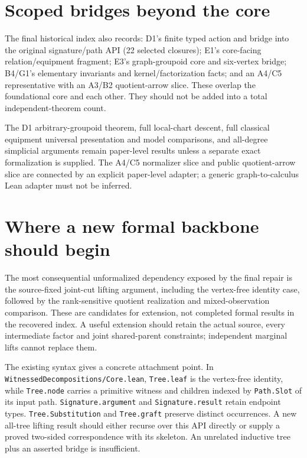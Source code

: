 \documentclass[11pt]{article}
\begin{document}
\section{Scoped bridges beyond the core}
The final historical index also records: D1's finite typed action and bridge into the original signature/path API (22 selected closures); E1's core-facing relation/equipment fragment; E3's graph-groupoid core and six-vertex bridge; B4/G1's elementary invariants and kernel/factorization facts; and an A4/C5 representative with an A3/B2 quotient-arrow slice. These overlap the foundational core and each other. They should not be added into a total independent-theorem count.

The D1 arbitrary-groupoid theorem, full local-chart descent, full classical equipment universal presentation and model comparisons, and all-degree simplicial arguments remain paper-level results unless a separate exact formalization is supplied. The A4/C5 normalizer slice and public quotient-arrow slice are connected by an explicit paper-level adapter; a generic graph-to-calculus Lean adapter must not be inferred.

\section{Where a new formal backbone should begin}
The most consequential unformalized dependency exposed by the final repair is the source-fixed joint-cut lifting argument, including the vertex-free identity case, followed by the rank-sensitive quotient realization and mixed-observation comparison. These are candidates for extension, not completed formal results in the recovered index. A useful extension should retain the actual source, every intermediate factor and joint shared-parent constraints; independent marginal lifts cannot replace them.

The existing syntax gives a concrete attachment point. In \texttt{WitnessedDecompositions/Core.lean}, \texttt{Tree.leaf} is the vertex-free identity, while \texttt{Tree.node} carries a primitive witness and children indexed by \texttt{Path.Slot} of its input path. \texttt{Signature.argument} and \texttt{Signature.result} retain endpoint types. \texttt{Tree.Substitution} and \texttt{Tree.graft} preserve distinct occurrences. A new all-tree lifting result should either recurse over this API directly or supply a proved two-sided correspondence with its skeleton. An unrelated inductive tree plus an asserted bridge is insufficient.
\end{document}
